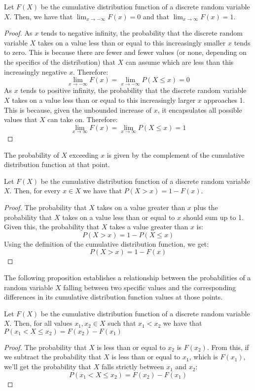 \begin{proposition}
Let $F(X)$ be the cumulative distribution function of a discrete random variable $X$. Then, we have that $\lim_{x\rightarrow-\infty}F\left(x\right)=0$ and that $\lim_{x\rightarrow\infty}F\left(x\right)=1$.
\end{proposition}
\begin{proof}
As $x$ tends to negative infinity, the probability that the discrete random variable $X$ takes on a value less than or equal to this increasingly smaller $x$ tends to zero. This is because there are fewer and fewer values (or none, depending on the specifics of the distribution) that $X$ can assume which are less than this increasingly negative $x$. Therefore:
\[
\lim_{x \rightarrow -\infty} F(x) = \lim_{x \rightarrow -\infty} P(X \leq x) = 0 
\]
As $x$ tends to positive infinity, the probability that the discrete random variable $X$ takes on a value less than or equal to this increasingly larger $x$ approaches 1. This is because, given the unbounded increase of $x$, it encapsulates all possible values that $X$ can take on. Therefore:
\[
\lim_{x \rightarrow \infty} F(x) = \lim_{x \rightarrow \infty} P(X \leq x) = 1
\]
\end{proof}

The probability of $X$ exceeding $x$ is given by the complement of the cumulative distribution function at that point.

\begin{proposition}
Let $F(X)$ be the cumulative distribution function of a discrete random variable $X$. Then, for every $x \in X$ we have that $P\left(X>x\right)=1-F\left(x\right)$.
\end{proposition}
\begin{proof}
The probability that $X$ takes on a value greater than $x$ plus the probability that $X$ takes on a value less than or equal to $x$ should sum up to 1. Given this, the probability that $X$ takes a value greater than $x$ is:
\[
P(X > x) = 1 - P(X \leq x)
\]
Using the definition of the cumulative distribution function, we get:
\[
P(X > x) = 1 - F(x) 
\]
\end{proof}

The following proposition establishes a relationship between the probabilities of a random variable \( X \) falling between two specific values and the corresponding differences in its cumulative distribution function values at those points.

\begin{proposition}
Let $F(X)$ be the cumulative distribution function of a discrete random variable $X$. Then, for all values $x_1, x_2 \in X$ such that $x_1 < x_2$ we have that $P\left(x_1 < X \leq x_2 \right) = F\left(x_2\right) - F\left(x_1\right)$
\end{proposition}
 \begin{proof}
The probability that $X$ is less than or equal to $x_2$ is $F(x_2)$. From this, if we subtract the probability that $X$ is less than or equal to $x_1$, which is $F(x_1)$, we'll get the probability that $X$ falls strictly between $x_1$ and $x_2$:
\[
P(x_1 < X \leq x_2) = F(x_2) - F(x_1)
\]
\end{proof}

